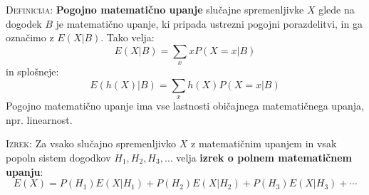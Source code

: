 \documentclass[8pt,a4paper]{amsart}
\theoremstyle{definition} %
\theoremstyle{plain} %
\begin{document}
\textsc{Definicija:} \textbf{Pogojno matematično upanje} slučajne spremenljivke $X$ glede na dogodek $B$ je matematično upanje, ki pripada ustrezni pogojni porazdelitvi, in ga označimo z $E(X | B)$. Tako velja:
$$
E(X | B) = \sum_x xP(X=x | B)
$$
in splošneje:
$$
E(h(X) | B) = \sum_x h(X) P(X=x | B)
$$
Pogojno matematično upanje ima vse lastnosti običajnega matematičnega upanja, npr. linearnost. 

\textsc{Izrek:} Za vsako slučajno spremenljivko $X$ z matematičnim upanjem in vsak popoln sistem dogodkov $H_1, H_2, H_3, \ldots $ velja \textbf{izrek o polnem matematičnem upanju}:
$$
E(X) = P(H_1)E(X|H_1) + P(H_2)E(X | H_2) + P(H_3)E(X | H_3) + \cdots
$$
\end{document}
